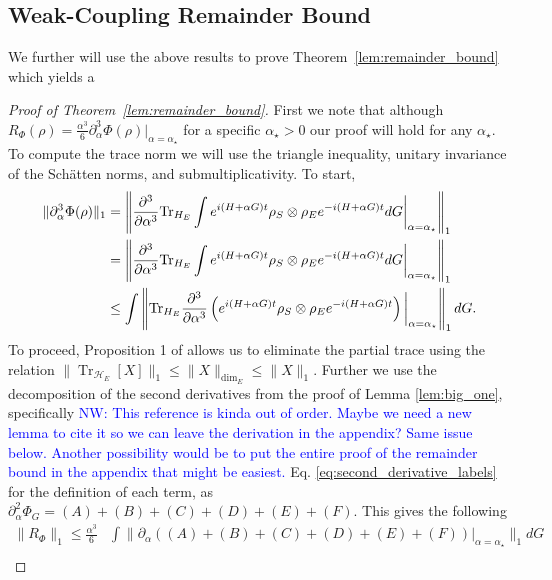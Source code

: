 \documentclass{article}
\newcommand{\brackets}[1]{\left[ #1 \right]}
\newcommand{\norm}[1]{\| #1 \|}
\DeclareMathOperator{\Tr}{Tr}
\newcommand{\partrace}[2]{\Tr_{#1} \brackets{ #2 }}
\newcommand{\hilb}{\mathcal{H}}
\begin{document}
\subsection{Weak-Coupling Remainder Bound} \label{sec:weak_coupling_remainder_bound}
We further will use the above results to prove Theorem~\ref{lem:remainder_bound} which yields a 

\begin{proof}[Proof of Theorem~\ref{lem:remainder_bound}]
First we note that although $R_{\Phi}(\rho) = \frac{\alpha^3}{6} \partial_{\alpha}^3 \Phi(\rho)\big|_{\alpha = \alpha_{\star}}$ for a specific $ \alpha_{\star} > 0$ our proof will hold for any $\alpha_{\star}$. To compute the trace norm we will use the triangle inequality, unitary invariance of the Sch\"{a}tten norms, and submultiplicativity. To start,
\begin{align}
    \|\partial_\alpha^3 \Phi(\rho) \|_1 &= \left\| \frac{\partial^3}{\partial \alpha^3} {\rm Tr}_{H_E} \int e^{i(H+\alpha G)t} \rho_S \otimes \rho_E e^{-i(H+\alpha G)t} dG \bigg|_{\alpha = \alpha_{\star}} \right\|_1 \nonumber\\
    &= \left\| \frac{\partial^3}{\partial \alpha^3} {\rm Tr}_{H_E} \int e^{i(H+\alpha G)t} \rho_S \otimes \rho_E e^{-i(H+\alpha G)t} dG \bigg|_{\alpha = \alpha_{\star}} \right\|_1 \nonumber\\
    &\le    \int \left\|{\rm Tr}_{H_E}\frac{\partial^3}{\partial \alpha^3}\left( e^{i(H+\alpha G)t} \rho_S \otimes \rho_E e^{-i(H+\alpha G)t}\right) \bigg|_{\alpha = \alpha_{\star}} \right\|_1 dG.\label{eq:3derivBd}
\end{align}
To proceed, Proposition 1 of \cite{rastegin2012relations} allows us to eliminate the partial trace using the relation
$\norm{\partrace{\hilb_E}{X}}_{1} \le \norm{X}_{\dim_E} \le \norm{X}_1$. Further we use the decomposition of the second derivatives from the proof of Lemma \ref{lem:big_one}, specifically \textcolor{blue}{NW: This reference is kinda out of order.  Maybe we need a new lemma to cite it so we can leave the derivation in the appendix?  Same issue below.  Another possibility would be to put the entire proof of the remainder bound in the appendix that might be easiest.}  Eq. \eqref{eq:second_derivative_labels} for the definition of each term, as $\partial_{\alpha}^2 \Phi_G = (A) + (B) + (C) + (D) +(E) + (F)$. This gives the following 
\begin{align}
    \norm{R_{\Phi}}_1 \le \frac{\alpha^3}{6} &\int \norm{\partial_{\alpha}((A) + (B) + (C) + (D) +(E) + (F)) \big|_{\alpha = \alpha_{\star}} }_1 dG \\

\end{align}
\end{proof}
\end{document}
